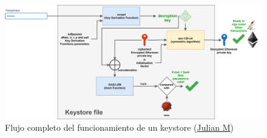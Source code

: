 \begin{landscape}
\begin{figure}[h!]
  \centering
  \includegraphics[scale=0.2]{figs/Anexo/keystore_completo}
  \caption[Flujo completo del funcionamiento de un keystore]{Flujo completo del funcionamiento de un keystore (\href{https://julien-maffre.medium.com/what-is-an-ethereum-keystore-file-86c8c5917b97}{Julian M})}
  \label{fig:keystore_completo}
\end{figure}
\end{landscape}
